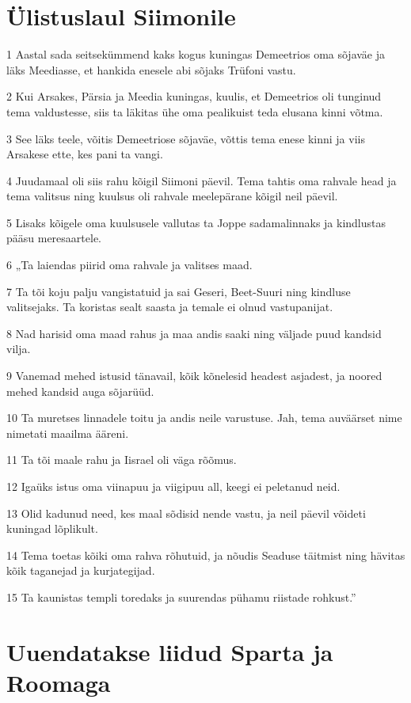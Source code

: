 \section*{Ülistuslaul Siimonile}

\par 1 Aastal sada seitsekümmend kaks kogus kuningas Demeetrios oma sõjaväe ja läks Meediasse, et hankida enesele abi sõjaks Trüfoni vastu.
\par 2 Kui Arsakes, Pärsia ja Meedia kuningas, kuulis, et Demeetrios oli tunginud tema valdustesse, siis ta läkitas ühe oma pealikuist teda elusana kinni võtma.
\par 3 See läks teele, võitis Demeetriose sõjaväe, võttis tema enese kinni ja viis Arsakese ette, kes pani ta vangi.
\par 4 Juudamaal oli siis rahu kõigil Siimoni päevil. Tema tahtis oma rahvale head ja tema valitsus ning kuulsus oli rahvale meelepärane kõigil neil päevil.
\par 5 Lisaks kõigele oma kuulsusele vallutas ta Joppe sadamalinnaks ja kindlustas pääsu meresaartele.
\par 6 „Ta laiendas piirid oma rahvale ja valitses maad.
\par 7 Ta tõi koju palju vangistatuid ja sai Geseri, Beet-Suuri ning kindluse valitsejaks. Ta koristas sealt saasta ja temale ei olnud vastupanijat.
\par 8 Nad harisid oma maad rahus ja maa andis saaki ning väljade puud kandsid vilja.
\par 9 Vanemad mehed istusid tänavail, kõik kõnelesid headest asjadest, ja noored mehed kandsid auga sõjarüüd.
\par 10 Ta muretses linnadele toitu ja andis neile varustuse. Jah, tema auväärset nime nimetati maailma ääreni.
\par 11 Ta tõi maale rahu ja Iisrael oli väga rõõmus.
\par 12 Igaüks istus oma viinapuu ja viigipuu all, keegi ei peletanud neid.
\par 13 Olid kadunud need, kes maal sõdisid nende vastu, ja neil päevil võideti kuningad lõplikult.
\par 14 Tema toetas kõiki oma rahva rõhutuid, ja nõudis Seaduse täitmist ning hävitas kõik taganejad ja kurjategijad.
\par 15 Ta kaunistas templi toredaks ja suurendas pühamu riistade rohkust.” 

\section*{Uuendatakse liidud Sparta ja Roomaga}

